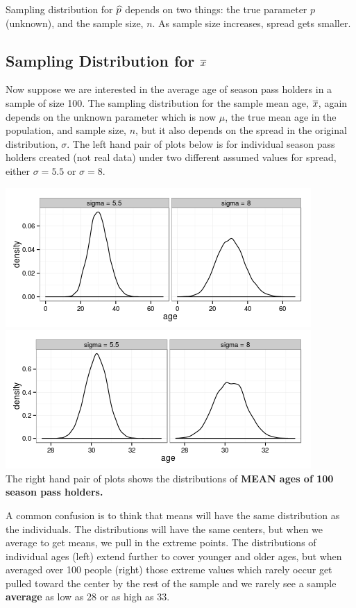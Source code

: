 Sampling distribution for $\widehat{p}$ depends on two things: the true
parameter $p$ (unknown), and the sample size, $n$. As sample size
increases, spread gets smaller. \vspace{1in}

\subsection{ Sampling Distribution for $\overline{x}$}

 Now suppose we are interested in the average age of season pass
 holders in a sample of size 100. The sampling distribution  for the
 sample mean age, $\overline{x}$, 
 again depends on the  unknown parameter which is now $\mu$, the true
 mean age in the population,  and sample size, $n$,
 but it also depends on the spread in the original distribution,
 $\sigma$.  
 The left hand pair of plots below is for individual season pass
 holders created (not real data) under two different assumed values
 for spread, either $\sigma = 5.5$ or $\sigma = 8$.

\includegraphics[width =.48\linewidth]{plots/twoSampDensities4x.png}
\hfill
\includegraphics[width =.48\linewidth]{plots/twoSampDensities4xbar.png}\\

 The right hand pair of plots  shows the distributions of {\bf MEAN ages of 100
   season pass holders.} 

 A common confusion is to think that means will have the same
 distribution as the individuals. The distributions will have the
 same centers, but when we average to get means, we pull in the
 extreme points.  The distributions of individual ages (left) extend
 further to cover younger and older ages, but when averaged over 100
 people (right) those extreme values which rarely occur get pulled
 toward the center by the rest of the sample and we rarely see a
 sample {\bf average} as low as 28 or as high as 33.


